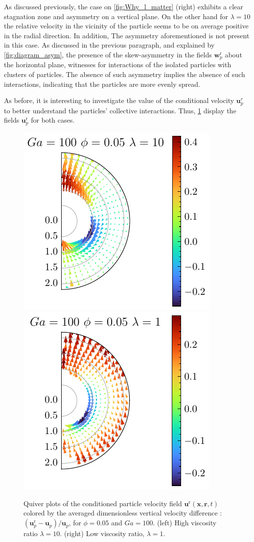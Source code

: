 As discussed previously, the case on \ref{fig:Why_l_matter} (right) exhibits a clear stagnation zone and asymmetry on a vertical plane. 
On the other hand for $\lambda =10$ the relative velocity in the vicinity of the particle seems to be on average positive in the radial direction. 
In addition, The asymmetry aforementioned is not present in this case. 
As discussed in the previous paragraph, and explained by \ref{fig:diagram_asym}, the presence of the skew-asymmetry in the fields $\textbf{w}_p^\text{r}$ about the horizontal plane, witnesses for interactions of the isolated particles with clusters of particles.
The absence of such asymmetry implies the absence of such interactions, indicating that the particles are more evenly spread. 

As before, it is interesting to investigate the value of the conditional velocity $\textbf{u}^r_p$ to better understand the particles' collective interactions. 
Thus, \ref{fig:unst_l} display the fields  $\textbf{u}_p^\text{r}$ for both cases. 
\begin{figure}[h!]
    \centering
    \includegraphics[height=0.35\textwidth]{image/HOMOGENEOUS_NEW/Dist/U_l_10_Ga_100_PHI_5.pdf}
    \includegraphics[height=0.35\textwidth]{image/HOMOGENEOUS_NEW/Dist/U_l_1_Ga_100_PHI_5.pdf}
    \caption{
         Quiver plots of the conditioned particle velocity field $\textbf{u}^\text{r}(\textbf{x},\textbf{r},t)$ colored by the averaged dimensionless vertical velocity difference : $(\textbf{u}^\text{r}_p - \textbf{u}_p )/ \textbf{u}_p$, for $\phi = 0.05$ and $Ga = 100$. 
         (left) High viscosity ratio $\lambda = 10$.
         (right) Low viscosity ratio, $\lambda = 1$.
         }
    \label{fig:unst_l}
\end{figure}
